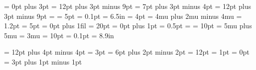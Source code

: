 \abovedisplayshortskip =   0pt plus 3pt
\abovedisplayskip      =  12pt plus 3pt minus 9pt
\belowdisplayshortskip =   7pt plus 3pt minus 4pt
\belowdisplayskip      =  12pt plus 3pt minus 9pt
\boxmaxdepth           = \maxdimen
\delimitershortfall    =   5pt
\hfuzz                 = 0.1pt
\hsize                 = 6.5in
\maxdepth              =   4pt
\medmuskip             =   4mu plus 2mu minus 4mu
\nulldelimiterspace    = 1.2pt
\overfullrule          =   5pt
\parfillskip           =   0pt plus 1fil
\parindent             =  20pt
\parskip               =   0pt plus 1pt
\scriptspace           = 0.5pt
\splitmaxdepth         = \maxdimen
\splittopskip          =  10pt
\thickmuskip           =   5mu plus 5mu
\thinmuskip            =   3mu
\topskip               =  10pt
\vfuzz                 = 0.1pt
\vsize                 = 8.9in


\newskip  \bigskipamount            
\newdimen \jot                      
\newskip  \medskipamount            
\newskip  \normalbaselineskip       
\newskip  \normallineskip           
\newdimen \normallineskiplimit      
\newskip  \smallskipamount          

\bigskipamount       = 12pt plus 4pt minus 4pt
\jot                 =  3pt
\medskipamount       =  6pt plus 2pt minus 2pt
\normalbaselineskip  = 12pt
\normallineskip      =  1pt
\normallineskiplimit =  0pt
\smallskipamount     =  3pt plus 1pt minus 1pt


\def\lq{`} 
\def\rq{'}

\def\lbrack{[} 
\def\rbrack{]}

\let\endgraf=\par 
\let\endline=\cr

\def\space{ }
\def\empty{}
\def\null {\hbox{}}


\long{}

